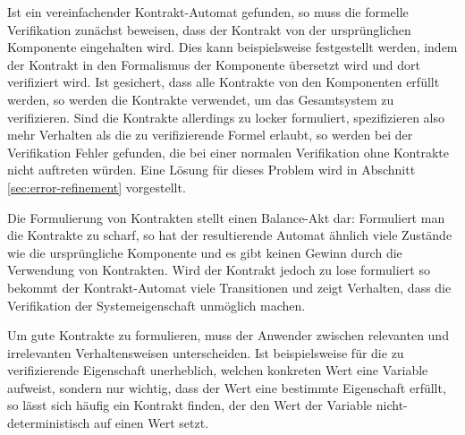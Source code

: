 Ist ein vereinfachender Kontrakt-Automat gefunden, so muss die formelle Verifikation zunächst beweisen, dass der Kontrakt von der ursprünglichen Komponente eingehalten wird.
Dies kann beispielsweise festgestellt werden, indem der Kontrakt in den Formalismus der Komponente übersetzt wird und dort verifiziert wird.
Ist gesichert, dass alle Kontrakte von den Komponenten erfüllt werden, so werden die Kontrakte verwendet, um das Gesamtsystem zu verifizieren.
Sind die Kontrakte allerdings zu locker formuliert, spezifizieren also mehr Verhalten als die zu verifizierende Formel erlaubt, so werden bei der Verifikation Fehler gefunden, die bei einer normalen Verifikation ohne Kontrakte nicht auftreten würden.
Eine Lösung für dieses Problem wird in Abschnitt \ref{sec:error-refinement} vorgestellt.

Die Formulierung von Kontrakten stellt einen Balance-Akt dar:
Formuliert man die Kontrakte zu scharf, so hat der resultierende Automat ähnlich viele Zustände wie die ursprüngliche Komponente und es gibt keinen Gewinn durch die Verwendung von Kontrakten.
Wird der Kontrakt jedoch zu lose formuliert so bekommt der Kontrakt-Automat viele Transitionen und zeigt Verhalten, dass die Verifikation der Systemeigenschaft unmöglich machen.

Um gute Kontrakte zu formulieren, muss der Anwender zwischen relevanten und irrelevanten Verhaltensweisen unterscheiden.
Ist beispielsweise für die zu verifizierende Eigenschaft unerheblich, welchen konkreten Wert eine Variable aufweist, sondern nur wichtig, dass der Wert eine bestimmte Eigenschaft erfüllt, so lässt sich häufig ein Kontrakt finden, der den Wert der Variable nicht-deterministisch auf einen Wert setzt.